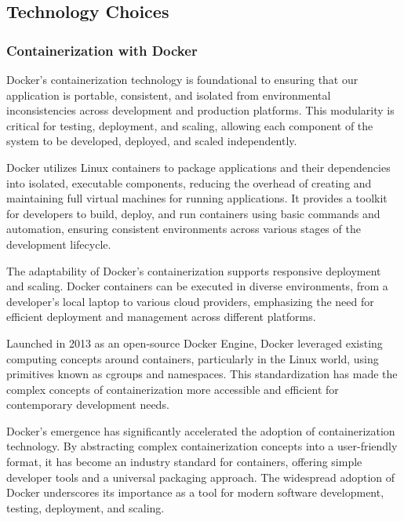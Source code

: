 \documentclass{article}
\begin{document}
    \subsection{Technology Choices}

    \subsubsection{Containerization with Docker}
    Docker's containerization technology is foundational to ensuring that our application is portable, consistent, and isolated from environmental inconsistencies across development and production platforms. This modularity is critical for testing, deployment, and scaling, allowing each component of the system to be developed, deployed, and scaled independently.

    Docker utilizes Linux containers to package applications and their dependencies into isolated, executable components, reducing the overhead of creating and maintaining full virtual machines for running applications. It provides a toolkit for developers to build, deploy, and run containers using basic commands and automation, ensuring consistent environments across various stages of the development lifecycle.

    The adaptability of Docker's containerization supports responsive deployment and scaling. Docker containers can be executed in diverse environments, from a developer's local laptop to various cloud providers, emphasizing the need for efficient deployment and management across different platforms.

    Launched in 2013 as an open-source Docker Engine, Docker leveraged existing computing concepts around containers, particularly in the Linux world, using primitives known as cgroups and namespaces. This standardization has made the complex concepts of containerization more accessible and efficient for contemporary development needs.

    Docker's emergence has significantly accelerated the adoption of containerization technology. By abstracting complex containerization concepts into a user-friendly format, it has become an industry standard for containers, offering simple developer tools and a universal packaging approach. The widespread adoption of Docker underscores its importance as a tool for modern software development, testing, deployment, and scaling.
\end{document}
